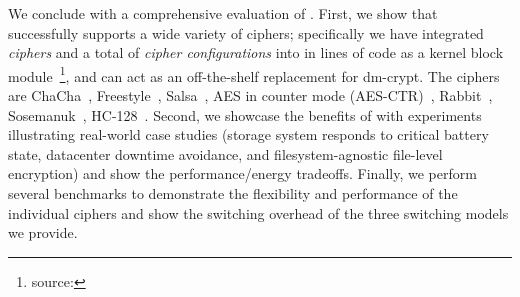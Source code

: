 We conclude with a comprehensive evaluation of \sys.
%
First, we show that \sys successfully supports a wide variety of ciphers;
specifically we have integrated {\em \numCiphers ciphers} and a total of {\em
\numConfigs cipher configurations} into \sys in \locTotal lines of code as a
kernel block module~\footnote{\label{ftn:foss}\sys source: \sysURI}, and can act
as an off-the-shelf replacement for dm-crypt. The ciphers are
ChaCha~\cite{ChaCha20}, Freestyle~\cite{Freestyle}, Salsa~\cite{SalsaX}, AES in
counter mode (AES-CTR)~\cite{AESCTR}, Rabbit~\cite{Rabbit},
Sosemanuk~\cite{Sosemanuk}, HC-128~\cite{HC128}.
%
Second, we showcase the benefits of \sys with experiments illustrating \numCases
real-world case studies (\ie storage system responds to critical battery state,
datacenter downtime avoidance, and filesystem-agnostic file-level encryption)
and show the performance/energy tradeoffs.
%
Finally, we perform several benchmarks to demonstrate the flexibility and
performance of the individual ciphers and show the switching overhead of the
three switching models we provide.
